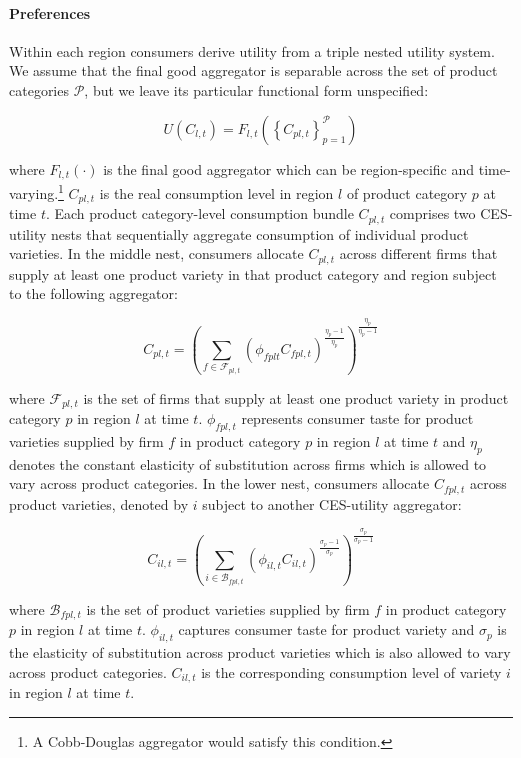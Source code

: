 \paragraph{Preferences}   Within each region consumers derive utility from a triple nested utility system. We assume that the final good aggregator is separable across the set of product categories $\mathcal{P}$, but we leave its particular functional form unspecified:
\begin{linenomath*}
    \begin{equation*}
        U(C_{l,t}) =  \mathit{F}_{l,t} \left(\left\{C_{pl,t}\right\}_{p = 1}^{\mathcal{P}}\right)
    \end{equation*}
\end{linenomath*}
\noindent where $\mathit{F}_{l,t}(\cdot)$ is the final good aggregator which can be region-specific and time-varying.\footnote{A Cobb-Douglas aggregator would satisfy this condition.} $C_{pl,t}$ is the real consumption level in region $l$ of product category $p$ at time $t$. Each product category-level consumption bundle $C_{pl,t}$ comprises two CES-utility nests that sequentially aggregate consumption of individual product varieties. In the middle nest, consumers allocate $C_{pl,t}$ across different firms that supply at least one product variety in that product category and region subject to the following aggregator: 
\begin{linenomath*}
    \begin{equation*}
        C_{pl,t} = \left(\sum_{f\in\mathcal{F}_{pl,t}}
                        \left(\phi_{fplt}C_{fpl,t}\right)^{\frac{\eta_p-1}{\eta_p}}
                    \right)^{\frac{\eta_p}{\eta_p-1}}
    \end{equation*} 
\end{linenomath*}
\noindent where $\mathcal{F}_{pl,t}$ is the set of firms that supply at least one product variety in product category $p$ in region $l$ at time $t$. $\phi_{fpl,t}$ represents consumer taste for product varieties supplied by firm $f$ in product category $p$ in region $l$ at time $t$ and $\eta_p$ denotes the constant elasticity of substitution across firms which is allowed to vary across product categories. In the lower nest, consumers allocate $C_{fpl,t}$ across product varieties, denoted by $i$ subject to another CES-utility aggregator: 
\begin{linenomath*}
    \begin{equation*}
        C_{il,t} = \left(\sum_{i\in\mathcal{B}_{fpl,t}}
                    \left(\phi_{il,t}C_{il,t}\right)^{\frac{\sigma_p-1}{\sigma_p}}
                  \right)^{\frac{\sigma_p}{\sigma_p-1}}
    \end{equation*} 
\end{linenomath*}
\noindent where $\mathcal{B}_{fpl,t}$ is the set of product varieties supplied by firm $f$ in product category $p$ in region $l$ at time $t$. $\phi_{il,t}$ captures consumer taste for product variety and $\sigma_p$ is the elasticity of substitution across product varieties which is also allowed to vary across product categories. $C_{il,t}$ is the corresponding consumption level of variety $i$ in region $l$ at time $t$.

